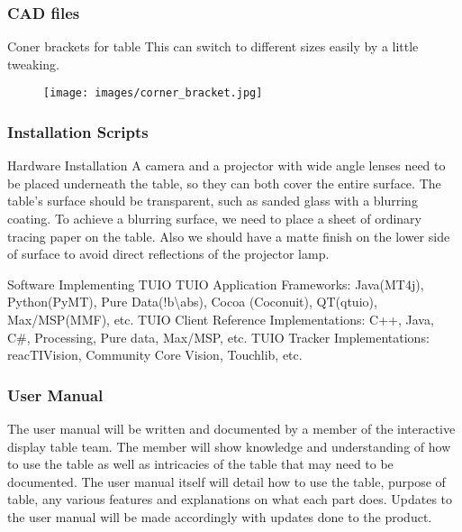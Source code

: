 \subsubsection{CAD files}
Coner brackets for table
    This can switch to different sizes easily by a little tweaking.
\begin{figure}[h!]
    \centering
    \texttt{[image: images/corner\_bracket.jpg]}
\end{figure}

\subsubsection{Installation Scripts}
Hardware Installation
A camera and a projector with wide angle lenses need to be placed underneath the table, so they can both cover the entire surface. The table's surface should be transparent, such as sanded glass with a blurring coating. To achieve a blurring surface, we need to place a sheet of ordinary tracing paper on the table. Also we should have a matte finish on the lower side of surface to avoid direct reflections of the projector lamp. 

Software Implementing TUIO
TUIO Application Frameworks: Java(MT4j), Python(PyMT), Pure Data(!b\textbackslash abs), Cocoa (Coconuit), QT(qtuio), Max/MSP(MMF), etc. 
TUIO Client Reference Implementations: C++, Java, C\#, Processing, Pure data, Max/MSP, etc.
TUIO Tracker Implementations: reacTIVision, Community Core Vision, Touchlib, etc.
    
\subsubsection{User Manual}
The user manual will be written and documented by a member of the interactive display table team. The member will show knowledge and understanding of how to use the table as well as intricacies of the table that may need to be documented. The user manual itself will detail how to use the table, purpose of table, any various features and explanations on what each part does. Updates to the user manual will be made accordingly with updates done to the product. 
